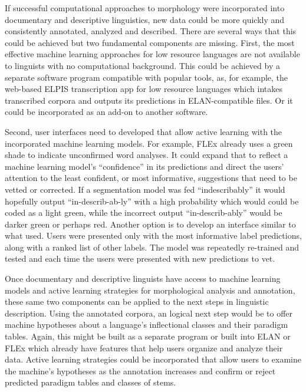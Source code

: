 \documentclass[12pt]{article}
\begin{document}
If successful computational approaches to morphology were incorporated into documentary and descriptive linguistics, new data could be more quickly and consistently annotated, analyzed and described. There are several ways that this could be achieved but two fundamental components are missing. First, the most effective machine learning approaches for low resource languages are not available to linguists with no computational background. This could be achieved by a separate software program compatible with popular tools, as, for example, the web-based ELPIS \cite{foley_elpis_2018} transcription app for low resource languages which intakes transcribed corpora and outputs its predictions in ELAN-compatible files. Or it could be incorporated as an add-on to another software. 

Second, user interfaces need to developed that allow active learning with the incorporated machine learning models. For example, FLEx already uses a green shade to indicate unconfirmed word analyses. It could expand that to reflect a machine learning model's ``confidence'' in its predictions and direct the users' attention to the least confident, or most informative, suggestions that need to be vetted or corrected. If a segmentation model was fed ``indescribably'' it would hopefully output ``in-describ-ab-ly'' with a high probability which would could be coded as a light green, while the incorrect output ``in-describ-ably'' would be darker green or perhaps red. Another option is to develop an interface similar to what  used. Users were presented only with the most informative label predictions, along with a ranked list of other labels. The model was repeatedly re-trained and tested and each time the users were presented with new predictions to vet.

Once documentary and descriptive linguists have access to machine learning models and active learning strategies for morphological analysis and annotation, these same two components can be applied to the next steps in linguistic description. Using the annotated corpora, an logical next step would be to offer machine hypotheses about a language's inflectional classes and their paradigm tables. Again, this might be built as a separate program or built into ELAN or FLEx which already have features that help users organize and analyze their data. Active learning strategies could be incorporated that allow users to examine the machine's hypotheses as the annotation increases and confirm or reject predicted paradigm tables and classes of stems.
\end{document}
